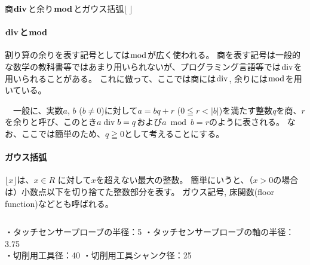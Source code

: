 \begin{Column}{商$\boldsymbol{\bDiv}$と余り$\boldsymbol{\bmod}$とガウス括弧$\boldsymbol{\lfloor\,\rfloor}$}
\renewcommand\theequation{c\thechapter.\arabic{equation}}
\setcounter{equation}{0}
\paragraph{$\boldsymbol\bDiv$と$\boldsymbol\bmod$}
割り算の余りを表す記号としては$\bmod$が広く使われる。
商を表す記号は一般的な数学の教科書等ではあまり用いられないが、プログラミング言語等では$\bDiv$を用いられることがある。
これに倣って、ここでは商には$\bDiv$, 余りには$\bmod$を用いている。

　一般に、実数$a$, $b$ ($b\neq0$)に対して$a = bq+r$ ($0 \leqq r < |b|$)を満たす整数$q$を商、$r$を余りと呼び、このとき$a \bDiv b = q$および$a \bmod b = r$のように表される。
なお、ここでは簡単のため、$q \geqq 0$として考えることにする。
\tcbline*
\paragraph{ガウス括弧}
$\lfloor x\rfloor$は、$x \in R$ に対して$x$を超えない最大の整数。
簡単にいうと、（$x > 0$の場合は）小数点以下を切り捨てた整数部分を表す。
ガウス記号, 床関数(floor function)などとも呼ばれる。
\end{Column}
\begin{tcolorbox}[title=内面溝加工に関する工具の情報, fonttitle=\gtfamily\bfseries]
・タッチセンサープローブの半径：5 \quad ・タッチセンサープローブの軸の半径：3.75\\
・切削用工具径：40 \quad ・切削用工具シャンク径：25
\end{tcolorbox}




\clearpage
